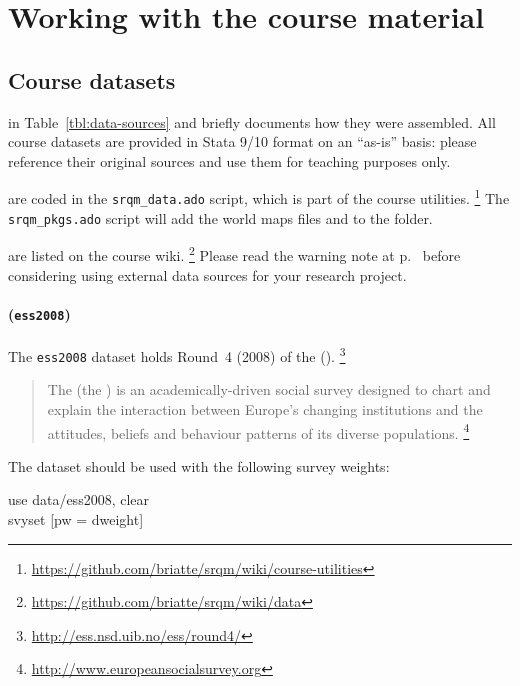 
\section{Working with the course material}


%
%
\subsection{Course datasets}
	\label{sec:data-sources}

 in Table~\ref{tbl:data-sources} and briefly documents how they were assembled. All course datasets are provided in Stata 9/10  format on an ``as-is'' basis: please reference their original sources and use them for teaching purposes only.%

 are coded in the \texttt{srqm\_data.ado} script, which is part of the course utilities.%
  \footnote{\url{https://github.com/briatte/srqm/wiki/course-utilities}} %
  The \texttt{srqm\_pkgs.ado} script will add the world maps files  and  to the \data folder.%

 are listed on the course wiki.%
  \footnote{\url{https://github.com/briatte/srqm/wiki/data}} %
  Please read the warning note at p.~\pageref{external-data-warning} before considering using external data sources for your research project.%



\paragraph{\ess (\texttt{ess2008})}

The \texttt{ess2008} dataset holds Round~4 (2008) of the \ess (\ESS).%
	\footnote{\url{http://ess.nsd.uib.no/ess/round4/}}

\begin{quote}
	The \ess (the \ESS) is an academically-driven social survey designed to chart and explain the interaction between Europe's changing institutions and the attitudes, beliefs and behaviour patterns of its diverse populations.%
	\footnote{\url{http://www.europeansocialsurvey.org}}
\end{quote}

The \ESS dataset should be used with the following survey weights:

\begin{docspec}
	use data/ess2008, clear\\
	svyset [pw = dweight]
\end{docspec}

